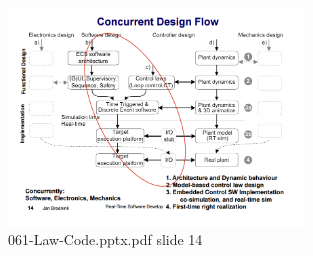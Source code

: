 \documentclass[a4paper,twoside,11pt]{article}
\begin{document}
\begin{figure}[ht]
	\centering
	\includegraphics[width=0.7\textwidth]{./img/slide.png}
	\caption{061-Law-Code.pptx.pdf slide 14}
	\label{fig:slide}
\end{figure}
\end{document}
